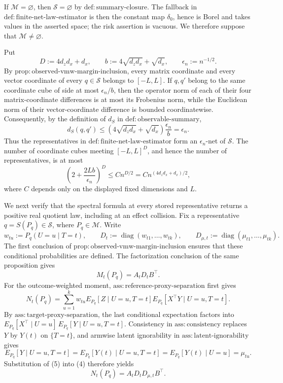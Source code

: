 If \(\mathcal M=\varnothing\), then \(\mathscr S=\varnothing\) by \(\mathrm{def:summary\text{-}closure}\).  The fallback in \(\mathrm{def:finite\text{-}net\text{-}law\text{-}estimator}\) is then the constant map \(\delta_0\), hence is Borel and takes values in the asserted space; the risk assertion is vacuous.  We therefore suppose that \(\mathcal M\ne\varnothing\).

Put
\[
D:=4d_zd_x+d_x,\qquad b:=4\sqrt{d_zd_x}+\sqrt{d_x},\qquad \epsilon_n:=n^{-1/2}.
\]
By \(\mathrm{prop:observed\text{-}vmw\text{-}margin\text{-}inclusion}\), every matrix coordinate and every vector coordinate of every \(q\in\mathscr S\) belongs to \([-L,L]\).  If \(q,q'\) belong to the same coordinate cube of side at most \(\epsilon_n/b\), then the operator norm of each of their four matrix-coordinate differences is at most its Frobenius norm, while the Euclidean norm of their vector-coordinate difference is bounded coordinatewise.  Consequently, by the definition of \(d_S\) in \(\mathrm{def:observable\text{-}summary}\),
\[
d_S(q,q')
 \le \left(4\sqrt{d_zd_x}+\sqrt{d_x}\right)\frac{\epsilon_n}{b}
 =\epsilon_n. \tag{1}
\]
Thus the representatives in \(\mathrm{def:finite\text{-}net\text{-}law\text{-}estimator}\) form an \(\epsilon_n\)-net of \(\mathscr S\).  The number of coordinate cubes meeting \([-L,L]^D\), and hence the number of representatives, is at most
\[
\left(2+\frac{2Lb}{\epsilon_n}\right)^D
 \le C n^{D/2}
 =C n^{(4d_zd_x+d_x)/2}, \tag{2}
\]
where \(C\) depends only on the displayed fixed dimensions and \(L\).

We next verify that the spectral formula at every stored representative returns a positive real quotient law, including at an effect collision.  Fix a representative \(q=S(P_q)\in\mathscr S\), where \(P_q\in\mathcal M\).  Write
\[
w_{tu}:=P_q(U=u\mid T=t),\qquad
D_t:=\operatorname{diag}(w_{t1},\ldots,w_{tk}),\qquad
D_{\mu,t}:=\operatorname{diag}(\mu_{t1},\ldots,\mu_{tk}).
\]
The first conclusion of \(\mathrm{prop:observed\text{-}vmw\text{-}margin\text{-}inclusion}\) ensures that these conditional probabilities are defined.  The factorization conclusion of the same proposition gives
\[
M_t(P_q)=A_tD_tB^\top. \tag{3}
\]
For the outcome-weighted moment, \(\mathrm{ass:reference\text{-}proxy\text{-}separation}\) first gives
\[
N_t(P_q)
=\sum_{u=1}^k w_{tu}E_{P_q}[Z\mid U=u,T=t]
 E_{P_q}[X^\top Y\mid U=u,T=t]. \tag{4}
\]
By \(\mathrm{ass:target\text{-}proxy\text{-}separation}\), the last conditional expectation factors into \(E_{P_q}[X^\top\mid U=u]\,E_{P_q}[Y\mid U=u,T=t]\).  Consistency in \(\mathrm{ass:consistency}\) replaces \(Y\) by \(Y(t)\) on \(\{T=t\}\), and armwise latent ignorability in \(\mathrm{ass:latent\text{-}ignorability}\) gives
\[
E_{P_q}[Y\mid U=u,T=t]
=E_{P_q}[Y(t)\mid U=u,T=t]
=E_{P_q}[Y(t)\mid U=u]
=\mu_{tu}. \tag{5}
\]
Substitution of (5) into (4) therefore yields
\[
N_t(P_q)=A_tD_tD_{\mu,t}B^\top. \tag{6}
\]

